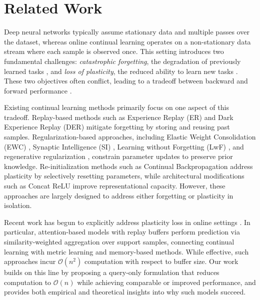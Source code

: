 \documentclass{article}
\begin{document}
\section{Related Work}

Deep neural networks typically assume stationary data and multiple passes over the dataset, whereas online continual learning operates on a non-stationary data stream where each sample is observed once. This setting introduces two fundamental challenges: \emph{catastrophic forgetting}, the degradation of previously learned tasks \citep{mccloskey1989catastrophic, kemker2018measuring, ramasesh2021anatomy}, and \emph{loss of plasticity}, the reduced ability to learn new tasks \citep{dohare2024loss, abbas2023plasticity}. These two objectives often conflict, leading to a tradeoff between backward and forward performance \citep{chen2023stability}.

Existing continual learning methods primarily focus on one aspect of this tradeoff. Replay-based methods such as Experience Replay (ER) \citep{rolnick2019experience} and Dark Experience Replay (DER) \citep{buzzega2020dark} mitigate forgetting by storing and reusing past samples. Regularization-based approaches, including Elastic Weight Consolidation (EWC) \citep{kirkpatrick2017overcoming}, Synaptic Intelligence (SI) \citep{zenke2017si}, Learning without Forgetting (LwF) \citep{li2016lwf}, and regenerative regularization \citep{abati2020regenerative}, constrain parameter updates to preserve prior knowledge. Re-initialization methods such as Continual Backpropagation address plasticity by selectively resetting parameters, while architectural modifications such as Concat ReLU \citep{abbas2023plasticity} improve representational capacity. However, these approaches are largely designed to address either forgetting or plasticity in isolation.

Recent work has begun to explicitly address plasticity loss in online settings \citep{dohare2024loss, wang2025replay}. In particular, attention-based models with replay buffers perform prediction via similarity-weighted aggregation over support samples, connecting continual learning with metric learning and memory-based methods. While effective, such approaches incur $\mathcal{O}(n^2)$ computation with respect to buffer size. Our work builds on this line by proposing a query-only formulation that reduces computation to $\mathcal{O}(n)$ while achieving comparable or improved performance, and provides both empirical and theoretical insights into why such models succeed.
\end{document}
